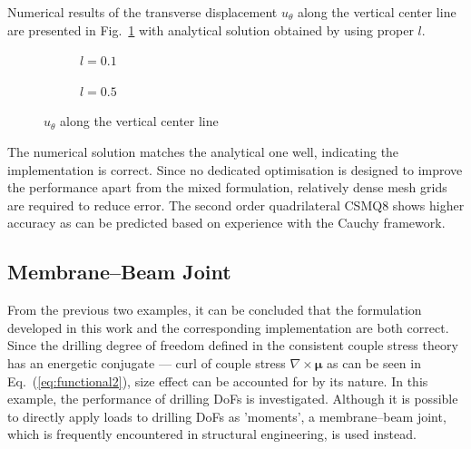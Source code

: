 \documentclass[3p,sort&compress,11pt,fleqn]{elsarticle}
\newcommand*{\figref}[1]{Fig.~\ref{#1}}
\newcommand*{\eqsref}[1]{Eq.~(\ref{#1})}
\begin{document}
Numerical results of the transverse displacement $u_\theta$ along the vertical center line are presented in \figref{fig:u_theta} with analytical solution obtained by using proper $l$.
\begin{figure}[htb]
\centering\footnotesize
\begin{subfigure}[b]{.49\textwidth}\centering

\caption{$l=\num{0.1}$}
\end{subfigure}\hfill
\begin{subfigure}[b]{.49\textwidth}\centering

\caption{$l=\num{0.5}$}
\end{subfigure}
\caption{$u_\theta$ along the vertical center line}\label{fig:u_theta}
\end{figure}
The numerical solution matches the analytical one well, indicating the implementation is correct. Since no dedicated optimisation is designed to improve the performance apart from the mixed formulation, relatively dense mesh grids are required to reduce error. The second order quadrilateral CSMQ8 shows higher accuracy as can be predicted based on experience with the Cauchy framework.
\subsection{Membrane--Beam Joint}
From the previous two examples, it can be concluded that the formulation developed in this work and the corresponding implementation are both correct. Since the drilling degree of freedom defined in the consistent couple stress theory has an energetic conjugate --- curl of couple stress $\nabla\times\mathbold{\mu}$ as can be seen in \eqsref{eq:functional2}, size effect can be accounted for by its nature. In this example, the performance of drilling DoFs is investigated. Although it is possible to directly apply loads to drilling DoFs as 'moments', a membrane--beam joint, which is frequently encountered in structural engineering, is used instead.
\end{document}
